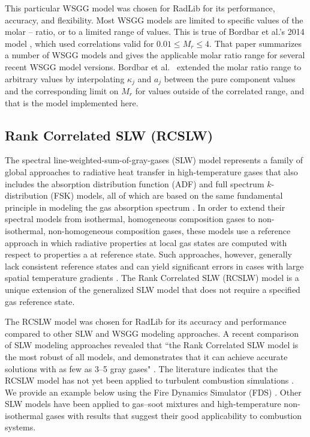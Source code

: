 \documentclass[preprint,12pt]{elsarticle}
\begin{document}
This particular WSGG model was chosen for RadLib for its performance, accuracy, and flexibility. Most WSGG models are limited to specific values of the molar -- ratio, or to a limited range of values. This is true of Bordbar et al.'s 2014 model \cite{Bordbar_2014}, which used correlations valid for $0.01\le M_r\le4$. That paper summarizes a number of WSGG models and gives the applicable molar ratio range for several recent WSGG model versions.
Bordbar et al.~\citep{Bordbar_2020} extended the molar ratio range to arbitrary values by interpolating $\kappa_j$ and $a_j$ between the pure component values and the corresponding limit on $M_r$ for values outside of the correlated range, and that is the model implemented here.


\subsection{Rank Correlated SLW (RCSLW)} \label{s:RCSLW}

The spectral line-weighted-sum-of-gray-gases (SLW) model represents a family of global approaches to radiative heat transfer in high-temperature gases that also includes the absorption distribution function (ADF) and full spectrum $k$-distribution (FSK) models, all of which are based on the same fundamental principle in modeling the gas absorption spectrum \cite{Solovjov_2016}. In order to extend their spectral models from isothermal, homogeneous composition gases to non-isothermal, non-homogeneous composition gases, these models use a reference approach in which radiative properties at local gas states are computed with respect to properties a at reference state. Such approaches, however, generally lack consistent reference states and can yield significant errors in cases with large spatial temperature gradients \cite{Solovjov_2017}. The Rank Correlated SLW (RCSLW) model is a unique extension of the generalized SLW model that does not require a specified gas reference state.

The RCSLW model was chosen for RadLib for its accuracy and performance compared to other SLW and WSGG modeling approaches. A recent comparison of SLW modeling approaches revealed that ``the Rank Correlated SLW model is the most robust of all models, and demonstrates that it can achieve accurate solutions with as few as 3–5 gray gases" \citep{Badger_2019}. The literature indicates that the RCSLW model has not yet been applied to turbulent combustion simulations \cite{Modest_2016,Coelho_2017}. We provide an example below using the Fire Dynamics Simulator (FDS) \cite{FDS}.
Other SLW models have been applied to gas--soot mixtures \cite{Solovjov_2001,Solovjov_2001b} and high-temperature non-isothermal gases \cite{Solovjov_2011,Solovjov_2020} with results that suggest their good applicability to combustion systems.
\end{document}
